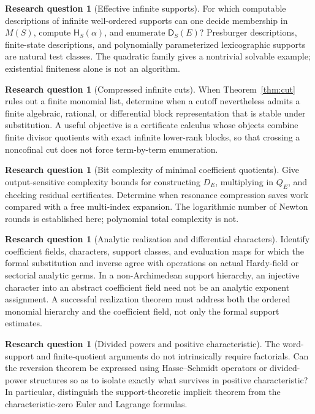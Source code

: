 \documentclass[11pt,a4paper]{article}
\theoremstyle{definition}
\newtheorem{question}[theorem]{Research question}
\theoremstyle{remark}
\newcommand{\depth}{\mathsf H}
\newcommand{\Div}{\mathsf D}
\begin{document}
\begin{question}[Effective infinite supports]
For which computable descriptions of infinite well-ordered supports can
one decide membership in $M(S)$, compute $\depth_S(\alpha)$, and enumerate
$\Div_S(E)$? Presburger descriptions, finite-state descriptions, and
polynomially parameterized lexicographic supports are natural test classes.
The quadratic family gives a nontrivial solvable example; existential
finiteness alone is not an algorithm.
\end{question}

\begin{question}[Compressed infinite cuts]
When Theorem~\ref{thm:cut} rules out a finite monomial list, determine when
a cutoff nevertheless admits a finite algebraic, rational, or differential
block representation that is stable under substitution. A useful objective
is a certificate calculus whose objects combine finite divisor quotients
with exact infinite lower-rank blocks, so that crossing a noncofinal cut
does not force term-by-term enumeration.
\end{question}

\begin{question}[Bit complexity of minimal coefficient quotients]
Give output-sensitive complexity bounds for constructing $D_E$, multiplying
in $Q_E$, and checking residual certificates. Determine when resonance
compression saves work compared with a free multi-index expansion. The
logarithmic number of Newton rounds is established here; polynomial total
complexity is not.
\end{question}

\begin{question}[Analytic realization and differential characters]
Identify coefficient fields, characters, support classes, and evaluation
maps for which the formal substitution and inverse agree with operations
on actual Hardy-field or sectorial analytic germs. In a non-Archimedean
support hierarchy, an injective character into an abstract coefficient
field need not be an analytic exponent assignment. A successful realization
theorem must address both the ordered monomial hierarchy and the coefficient
field, not only the formal support estimates.
\end{question}

\begin{question}[Divided powers and positive characteristic]
The word-support and finite-quotient arguments do not intrinsically require
factorials. Can the reversion theorem be expressed using Hasse--Schmidt
operators or divided-power structures so as to isolate exactly what
survives in positive characteristic? In particular, distinguish the
support-theoretic implicit theorem from the characteristic-zero Euler and
Lagrange formulas.
\end{question}
\end{document}
